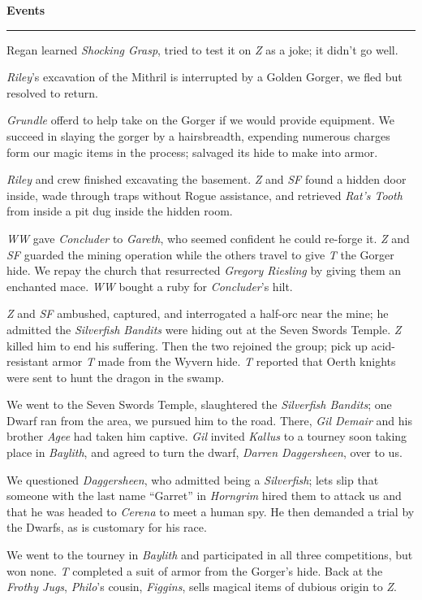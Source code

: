 \documentclass[letterpaper]{article}
\newcommand{\e}[1]{\emph{#1}}
\newcommand{\B}[1]{\textbf{#1}}
\newenvironment{notesection}[1]
{ {\huge \B{#1}}\hrule\vspace{0.5em}\begingroup\fontsize{9pt}{12pt}\selectfont}
{\endgroup}
\begin{document}
\begin{notesection}{Events}
Regan learned \e{Shocking Grasp}, tried to test it on \e{Z} as a joke; it didn't go well.

\e{Riley}'s excavation of the Mithril is interrupted by a Golden Gorger, we fled but resolved to return.

\e{Grundle} offerd to help take on the Gorger if we would provide equipment. We succeed in slaying the gorger by a hairsbreadth, expending numerous charges form our magic items in the process; salvaged its hide to make into armor.

\e{Riley} and crew finished excavating the basement. \e{Z} and \e{SF} found a hidden door inside, wade through traps without Rogue assistance, and retrieved \e{Rat's Tooth} from inside a pit dug inside the hidden room.

\e{WW} gave \e{Concluder} to \e{Gareth}, who seemed confident he could re-forge it.  \e{Z} and \e{SF} guarded the mining operation while the others travel to give \e{T} the Gorger hide. We repay the church that resurrected \e{Gregory Riesling} by giving them an enchanted mace. \e{WW} bought a ruby for \e{Concluder}'s hilt.

\e{Z} and \e{SF} ambushed, captured, and interrogated a half-orc near the mine; he admitted the \e{Silverfish Bandits} were hiding out at the Seven Swords Temple. \e{Z} killed him to end his suffering. Then the two rejoined the group; pick up acid-resistant armor \e{T} made from the Wyvern hide.  \e{T} reported that Oerth knights were sent to hunt the dragon in the swamp.

We went to the Seven Swords Temple, slaughtered the \e{Silverfish Bandits}; one Dwarf ran from the area, we pursued him to the road. There, \e{Gil Demair} and his brother \e{Agee} had taken him captive. \e{Gil} invited \e{Kallus} to a tourney soon taking place in \e{Baylith}, and agreed to turn the dwarf, \e{Darren Daggersheen}, over to us.

We questioned \e{Daggersheen}, who admitted being a \e{Silverfish}; lets slip that someone with the last name ``Garret'' in \e{Horngrim} hired them to attack us and that he was headed to \e{Cerena} to meet a human spy.  He then demanded a trial by the Dwarfs, as is customary for his race.

We went to the tourney in \e{Baylith} and participated in all three competitions, but won none. \e{T} completed a suit of armor from the Gorger's hide. Back at the \e{Frothy Jugs}, \e{Philo}'s cousin, \e{Figgins}, sells magical items of dubious origin to \e{Z}.


\end{notesection}
\end{document}
